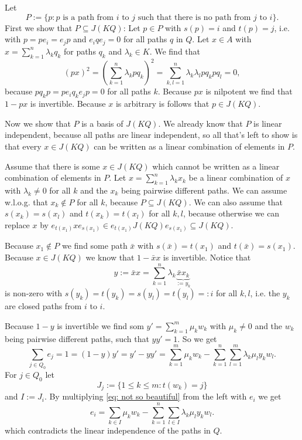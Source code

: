 \documentclass[a4paper,10pt]{article}
\theoremstyle{definition}
\begin{document}
\section{}
Let
\[
 P := \{p : \text{$p$ is a path from $i$ to $j$ such that there is no path from $j$ to $i$}\}.
\]
First we show that $P \subseteq J(KQ)$: Let $p \in P$ with $s(p) = i$ and $t(p)=j$, i.e. with $p = p e_i = e_j p$ and $e_i q e_j = 0$ for all paths $q$ in $Q$. Let $x \in A$ with $x = \sum_{k=1}^n \lambda_k q_k$ for paths $q_k$ and $\lambda_k \in K$. We find that
\[
 (px)^2
 = \left( \sum_{k=1}^n \lambda_k p q_k \right)^2
 = \sum_{k,l=1}^n \lambda_k \lambda_l p q_k p q_l
 = 0,
\]
because $p q_k p = p e_i q_k e_j p = 0$ for all paths $k$. Because $px$ is nilpotent we find that $1-px$ is invertible. Because $x$ is arbitrary is follows that $p \in J(KQ)$.

Now we show that $P$ is a basis of $J(KQ)$. We already know that $P$ is linear independent, because all paths are linear independent, so all that's left to show is that every $x \in J(KQ)$ can be written as a linear combination of elements in $P$.

Assume that there is some $x \in J(KQ)$ which cannot be written as a linear combination of elements in $P$. Let $x = \sum_{k=1}^n \lambda_k x_k$ be a linear combination of $x$ with $\lambda_k \neq 0$ for all $k$ and the $x_k$ being pairwise different paths. We can assume w.l.o.g. that $x_k \not\in P$ for all $k$, because $P \subseteq J(KQ)$. We can also assume that $s(x_k) = s(x_l)$ and $t(x_k) = t(x_l)$ for all $k,l$, because otherwise we can replace $x$ by $e_{t(x_1)} x e_{s(x_1)} \in e_{t(x_1)} J(KQ) e_{s(x_1)} \subseteq J(KQ)$.

Because $x_1 \not\in P$ we find some path $\bar{x}$ with $s(\bar{x}) = t(x_1)$ and $t(\bar{x}) = s(x_1)$. Because $x \in J(KQ)$ we know that $1-\bar{x}x$ is invertible. Notice that
\[
 y := \bar{x}{x} = \sum_{k=1}^n \lambda_k \underbrace{\bar{x} x_k}_{:= y_k}
\]
is non-zero with $s(y_k) = t(y_k) = s(y_l) = t(y_l) =: i$ for all $k,l$, i.e. the $y_k$ are closed paths from $i$ to $i$.

Because $1-y$ is invertible we find som $y' = \sum_{k=1}^m \mu_k w_k$ with $\mu_k \neq 0$ and the $w_k$ being pairwise different paths, such that $yy' = 1$. So we get
\begin{equation}\label{eq: not so beautiful}
 \sum_{j \in Q_0} e_j
 = 1
 = (1-y) y'
 = y' - yy'
 = \sum_{k=1}^m \mu_k w_k - \sum_{k=1}^n \sum_{l=1}^m \lambda_k \mu_l y_k w_l.
\end{equation}
For $j \in Q_0$ let
\[
 J_j := \{1 \leq k \leq m: t(w_k) = j\}
\]
and $I := J_i$. By multiplying \eqref{eq: not so beautiful} from the left with $e_i$ we get
\[
 e_i = \sum_{k \in I} \mu_k w_k - \sum_{k=1}^n \sum_{l \in I} \lambda_k \mu_l y_k w_l.
\]
which contradicts the linear independence of the paths in $Q$.
\end{document}
